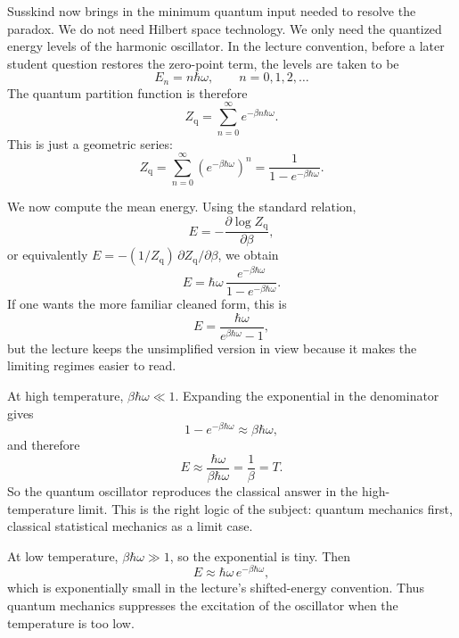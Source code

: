 Susskind now brings in the minimum quantum input needed to resolve the paradox. We do not need Hilbert space technology. We only need the quantized energy levels of the harmonic oscillator. In the lecture convention, before a later student question restores the zero-point term, the levels are taken to be
\begin{equation}
E_n=n\hbar\omega,
\qquad n=0,1,2,\dots
\end{equation}
The quantum partition function is therefore
\begin{equation}
Z_{\mathrm{q}}=\sum_{n=0}^{\infty}e^{-\beta n\hbar\omega}.
\end{equation}
This is just a geometric series:
\begin{equation}
Z_{\mathrm{q}}
=\sum_{n=0}^{\infty}\left(e^{-\beta\hbar\omega}\right)^n
=\frac{1}{1-e^{-\beta\hbar\omega}}.
\end{equation}

We now compute the mean energy. Using the standard relation,
\begin{equation}
E=-\frac{\partial \log Z_{\mathrm{q}}}{\partial \beta},
\end{equation}
or equivalently \(E=-(1/Z_{\mathrm{q}})\,\partial Z_{\mathrm{q}}/\partial\beta\), we obtain
\begin{equation}
E=\hbar\omega\,\frac{e^{-\beta\hbar\omega}}{1-e^{-\beta\hbar\omega}}.
\end{equation}
If one wants the more familiar cleaned form, this is
\begin{equation}
E=\frac{\hbar\omega}{e^{\beta\hbar\omega}-1},
\end{equation}
but the lecture keeps the unsimplified version in view because it makes the limiting regimes easier to read.

At high temperature, \(\beta\hbar\omega\ll 1\). Expanding the exponential in the denominator gives
\begin{equation}
1-e^{-\beta\hbar\omega}\approx \beta\hbar\omega,
\end{equation}
and therefore
\begin{equation}
E\approx \frac{\hbar\omega}{\beta\hbar\omega}=\frac{1}{\beta}=T.
\end{equation}
So the quantum oscillator reproduces the classical answer in the high-temperature limit. This is the right logic of the subject: quantum mechanics first, classical statistical mechanics as a limit case.

At low temperature, \(\beta\hbar\omega\gg 1\), so the exponential is tiny. Then
\begin{equation}
E\approx \hbar\omega\,e^{-\beta\hbar\omega},
\end{equation}
which is exponentially small in the lecture's shifted-energy convention. Thus quantum mechanics suppresses the excitation of the oscillator when the temperature is too low.


